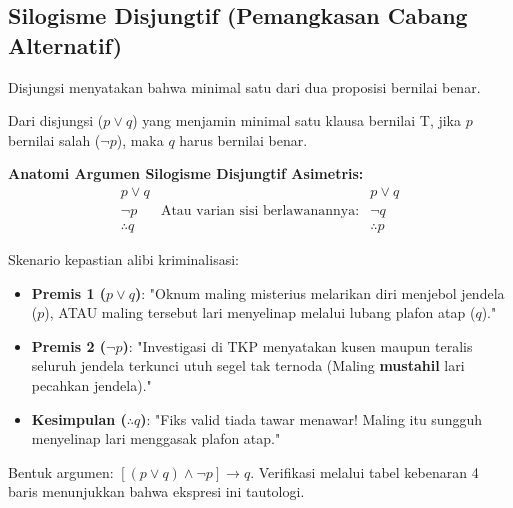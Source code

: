 \subsection{Silogisme Disjungtif (Pemangkasan Cabang Alternatif)}

Disjungsi menyatakan bahwa minimal satu dari dua proposisi bernilai benar.

\begin{teorema}
Dari disjungsi ($p \lor q$) yang menjamin minimal satu klausa bernilai T, jika $p$ bernilai salah ($\neg p$), maka $q$ harus bernilai benar.
\end{teorema}

\textbf{Anatomi Argumen Silogisme Disjungtif Asimetris:}
\[
\begin{array}{ccc}
p \vee q & & p \vee q\\
\neg p   & \text{Atau varian sisi berlawanannya:} & \neg q \\
\hline
\therefore q & & \therefore p
\end{array}
\]

\begin{contoh}
Skenario kepastian alibi kriminalisasi:
\begin{itemize}
    \item \textbf{Premis 1 ($p \vee q$)}: "Oknum maling misterius melarikan diri menjebol jendela ($p$), ATAU maling tersebut lari menyelinap melalui lubang plafon atap ($q$)."
    \item \textbf{Premis 2 ($\neg p$)}: "Investigasi di TKP menyatakan kusen maupun teralis seluruh jendela terkunci utuh segel tak ternoda (Maling \textbf{mustahil} lari pecahkan jendela)."
    \item \textbf{Kesimpulan ($\therefore q$)}: "Fiks valid tiada tawar menawar! Maling itu sungguh menyelinap lari menggasak plafon atap."
\end{itemize}
\end{contoh}
Bentuk argumen: $[(p \lor q) \land \neg p] \rightarrow q$. Verifikasi melalui tabel kebenaran 4 baris menunjukkan bahwa ekspresi ini tautologi.

